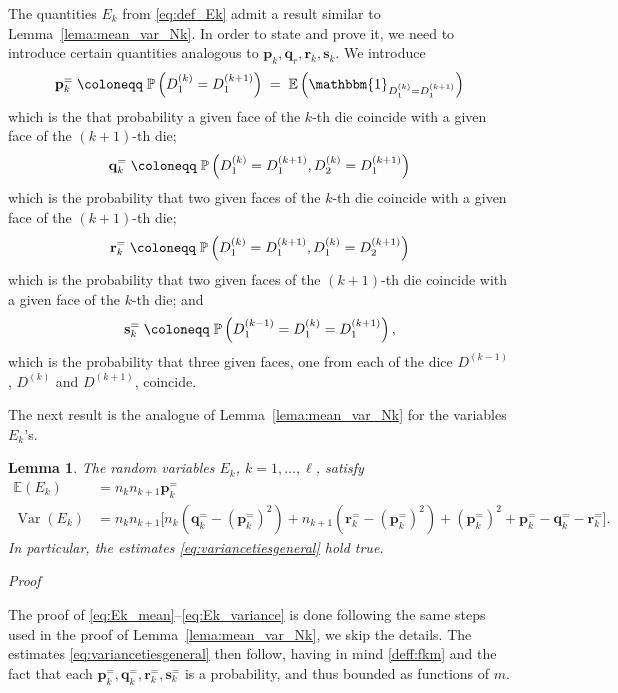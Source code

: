 \documentclass[reqno,a4paper,11pt]{amsart}
\makeatletter
\newtheorem{lemma}{Lemma}
\theoremstyle{remark}
\newcommand{\mb}[1]{{\mathbf #1}}
\newcommand{\bb}[1]{{\mathbb #1}}
\newcommand{\ind}{\mathbbm{1}}
\numberwithin{equation}{section}
\newcommand{\var}[1]{\operatorname{Var}\left(#1\right)}
\renewenvironment{proof}[1][Proof]{\par
\pushQED{\qed}%
\normalfont \topsep6\p@\@plus6\p@\relax
\trivlist
\item\relax
{\itshape
#1\@addpunct{.}}\hspace\labelsep\ignorespaces
}{%
\popQED\endtrivlist\@endpefalse
}
\makeatother
\begin{document}
The quantities $E_k$ from \eqref{eq:def_Ek} admit a result similar to Lemma~\ref{lema:mean_var_Nk}. In order to state and prove it, we need to introduce certain quantities analogous to $\mb p_k,\mb q_r, \mb r_k, \mb s_k$. We introduce
%
\begin{equation}\label{eq:defpkequal}
{\bf p}_k^= \;\coloneqq\; \bb P\left(D^{(k)}_1= D^{(k+1)}_1\right)\;=\;\bb E\left(\ind_{D_1^{(k)}=D_1^{(k+1)}}\right)
\end{equation}
which is the that probability a given face of the $k$-th die coincide with a given face of the  $(k+1)$-th die;
\begin{equation}\label{eq:defqkequal}
{\bf q}_k^= \;\coloneqq\; \bb P\left(D^{(k)}_1= D^{(k+1)}_1, D^{(k)}_2= D^{(k+1)}_1\right)
\end{equation}
%
which is the probability that two given faces of the $k$-th die coincide with a given face of the  $(k+1)$-th die;
\begin{equation}\label{eq:defrkequal}
{\bf r}_k^= \;\coloneqq\; \bb P\left(D^{(k)}_1= D^{(k+1)}_1, D^{(k)}_1= D^{(k+1)}_2\right)
\end{equation}
%
which is the probability that two given faces of the $(k+1)$-th die coincide with a given face of the  $k$-th die; and
\begin{equation}\label{eq:defskequal}
{\bf s}_k^= \;\coloneqq\; \bb P\left(D^{(k-1)}_1 = D^{(k)}_1 = D^{(k+1)}_1\right),
\end{equation}
%
which is the probability that three given faces, one from each of the dice $D^{(k-1)}$, $D^{(k)}$ and $D^{(k+1)}$, coincide.

The next result is the analogue of Lemma~\ref{lema:mean_var_Nk} for the variables $E_k$'s.

\begin{lemma}\label{lem:meanvarEk}
The random variables $E_k$, $k=1,\hdots,\ell$, satisfy
%
\begin{align}
\bb E \left(E_k\right) &= n_k n_{k+1} \mb p_k^=  \label{eq:Ek_mean}\\
\var{E_k}
    &= n_k n_{k+1}
    \bigl[n_k(\mb q_k^= - (\mb p_k^=)^2) + n_{k+1}(\mb r_k^= - (\mb p_k^=)^2) 
    + (\mb p_k^{=})^2 +\mb p_k^= - \mb q_k^= - \mb r_k^=
    \bigr].\label{eq:Ek_variance}
\end{align}
In particular, the estimates \eqref{eq:variancetiesgeneral} hold true.
\end{lemma}
\begin{proof}
The proof of \eqref{eq:Ek_mean}--\eqref{eq:Ek_variance} is done following the same steps used in the proof of Lemma~\ref{lema:mean_var_Nk}, we skip the details. The estimates \eqref{eq:variancetiesgeneral} then follow, having in mind \eqref{deff:fkm} and the fact that each $\mb p_k^=, \mb q_k^=, \mb r_k^=, \mb s_k^=$ is a probability, and thus bounded as functions of $m$.
\end{proof}
\end{document}
